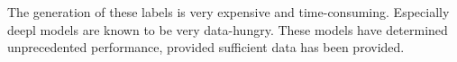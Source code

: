 The generation of these labels is very expensive and time-consuming.
Especially \gls{deepl} models are known to be very data-hungry. 
These models have determined unprecedented performance, provided sufficient data has been provided.


